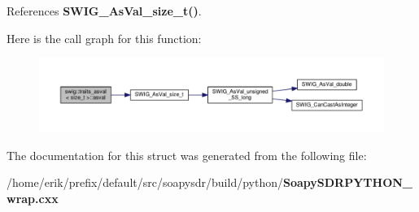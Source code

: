References {\bf S\+W\+I\+G\+\_\+\+As\+Val\+\_\+size\+\_\+t()}.



Here is the call graph for this function\+:
\nopagebreak
\begin{figure}[H]
\begin{center}
\leavevmode
\includegraphics[width=350pt]{d4/d61/structswig_1_1traits__asval_3_01size__t_01_4_a6ba1f598377494287ecd0c3138323db5_cgraph}
\end{center}
\end{figure}




The documentation for this struct was generated from the following file\+:\begin{DoxyCompactItemize}
\item 
/home/erik/prefix/default/src/soapysdr/build/python/{\bf Soapy\+S\+D\+R\+P\+Y\+T\+H\+O\+N\+\_\+wrap.\+cxx}\end{DoxyCompactItemize}
